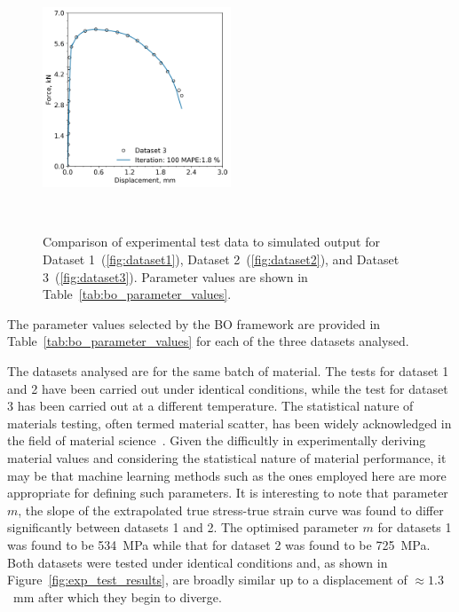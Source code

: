 \documentclass[preprint, review, 12pt]{elsarticle}
\begin{document}
\begin{figure}[!htbp]
\begin{minipage}[b]{0.5\linewidth}
			\label{fig:dataset2}
		\end{minipage}%
	\vspace{0.2cm}
		\begin{minipage}[b]{\linewidth}
			\centering
			\includegraphics[width=0.5\textwidth, height=0.45\textheight, keepaspectratio]{P91_500_FASTEST_ITERATION}
			\label{fig:dataset3}
		\end{minipage}~\caption{Comparison of experimental test data to simulated output for Dataset 1~(\ref{fig:dataset1}), Dataset 2~(\ref{fig:dataset2}), and Dataset 3~(\ref{fig:dataset3}). Parameter values are shown in Table~\ref{tab:bo_parameter_values}.}
	\label{fig:bo_result}
	\end{figure}
	The parameter values selected by the BO framework are provided in Table~\ref{tab:bo_parameter_values} for each of the three datasets analysed.

	

	The datasets analysed are for the same batch of material.
	The tests for dataset 1 and 2 have been carried out under identical conditions, while the test for dataset 3 has been carried out at a different temperature.
	The statistical nature of materials testing, often termed material scatter, has been widely acknowledged in the field of material science~\cite{OCONNOR2022}.
	Given the difficultly in experimentally deriving material values and considering the statistical nature of material performance, it may be that machine learning methods such as the ones employed here are more appropriate for defining such parameters.
	It is interesting to note that parameter $m$, the slope of the extrapolated true stress-true strain curve was found to differ significantly between datasets 1 and 2.
	The optimised parameter $m$ for datasets 1 was found to be 534~MPa while that for dataset 2 was found to be 725~MPa.
	Both datasets were tested under identical conditions and, as shown in Figure~\ref{fig:exp_test_results}, are broadly similar up to a displacement of $\approx 1.3$~mm after which they begin to diverge.
\end{document}
